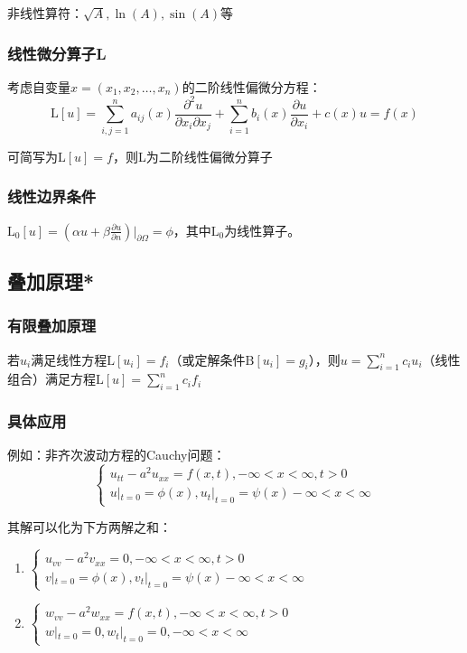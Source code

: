 非线性算符：\(\sqrt A,\ln{(A)},\sin{(A)}\)等

\subsubsection{线性微分算子L}

考虑自变量\(x=(x_1,x_2,\ldots,x_n)\)的二阶线性偏微分方程：
\[
\mathrm{L}[u]=\sum_{i,j=1}^na_{ij}(x)\frac{\partial^2u}{\partial x_i\partial x_j}+\sum_{i=1}^nb_i(x)\frac{\partial u}{\partial x_i}+c(x)u=f(x)
\]

可简写为\(\mathrm{L}[u]=f\)，则L为二阶线性偏微分算子

\subsubsection{线性边界条件}

\(\mathrm{L}_0[u]=\left(\alpha u+\beta\frac{\partial u}{\partial n}\right)|_{\partial\Omega}=\phi\)，其中\(\mathrm{L}_0\)为线性算子。

\subsection{叠加原理*}

\subsubsection{有限叠加原理}

若\(u_i\)满足线性方程\(\mathrm{L}\left[u_i\right]=f_i\)（或定解条件\(\mathrm{B}[u_i]=g_i\)），则\(u=\sum\limits_{i=1}^nc_iu_i\)（线性组合）满足方程\(\mathrm{L}[u]=\sum\limits_{i=1}^nc_if_i\)

\subsubsection{具体应用}

例如：非齐次波动方程的Cauchy问题：
\[
\begin{cases}u_{tt}-a^2u_{xx}=f(x,t),-\infty<x<\infty,t>0\\u|_{t=0}=\phi(x),u_t|_{t=0}=\psi(x)-\infty<x<\infty\end{cases}
\]

其解可以化为下方两解之和：
\begin{enumerate}
	\item \(\begin{cases}u_{vv}-a^2v_{xx}=0,-\infty<x<\infty,t>0\\v|_{t=0}=\phi(x),v_t|_{t=0}=\psi(x)-\infty<x<\infty\end{cases}\)
	\item \(\begin{cases}w_{vv}-a^2w_{xx}=f(x,t),-\infty<x<\infty,t>0\\w|_{t=0}=0,w_t|_{t=0}=0,-\infty<x<\infty\end{cases}\)
\end{enumerate}

